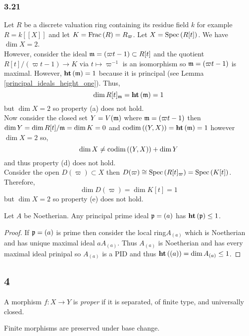 \documentclass[12pt]{article}
\begin{document}
\subsubsection{3.21}

Let $R$ be a discrete valuation ring containing its residue field $k$ for example $R = k[[X]]$ and let $K = \mathrm{Frac}\left(R\right) = R_\varpi$. Let $X = \mathrm{Spec}\left( R[t] \right)$. We have $\dim{X} = 2$. 
\bigskip\\
However, consider the ideal $\mathfrak{m} = (\varpi t - 1) \subset R[t]$ and the quotient $R[t]/(\varpi t - 1) \to K$ via $t \mapsto \varpi^{-1}$ is an isomorphism so $\mathfrak{m} = (\varpi t - 1)$ is maximal. However, $\mathbf{ht}\left( \mathfrak{m} \right) = 1$ because it is principal (see Lemma \ref{principal_ideals_height_one}). Thus,
\[ \dim{R[t]_{\mathfrak{m}}} = \mathbf{ht}\left( \mathfrak{m} \right) = 1 \]
but $\dim{X} = 2$ so property (a) does not hold.
\bigskip\\
Now consider the closed set $Y = V(\mathfrak{m})$ where $\mathfrak{m} = (\varpi t - 1)$ then $\dim{Y} = \dim{R[t] / \mathfrak{m}} = \dim{K} = 0$ and $\mathrm{codim}\left( (Y, X) \right) = \mathbf{ht}\left( \mathfrak{m} \right) = 1$ however $\dim{X} = 2$ so,
\[ \dim{X} \neq \mathrm{codim}\left( (Y, X) \right) + \dim{Y} \]
and thus property (d) does not hold. 
\bigskip\\
Consider the open $D(\varpi) \subset X$ then $D(\varpi) \cong \mathrm{Spec}\left( R[t]_\varpi \right) = \mathrm{Spec}\left( K[t] \right)$. Therefore,
\[ \dim{D(\varpi)} = \dim{K[t]} = 1 \]
but $\dim{X} = 2$ so property (e) does not hold.

\begin{lemma} \label{principal_ideals_height_one}
Let $A$ be Noetherian. Any principal prime ideal $\mathfrak{p} = (a)$ has $\mathbf{ht}\left( \mathfrak{p} \right) \le 1$.
\end{lemma}

\begin{proof}
If $\mathfrak{p} = (a)$ is prime then consider the local ring$A_{(a)}$ which is Noetherian and has unique maximal ideal $a A_{(a)}$. Thus $A_{(a)}$ is Noetherian and has every maximal ideal prinipal so $A_{(a)}$ is a PID and thus $\mathbf{ht}\left( (a) \right) = \dim{A_{(a)}} \le 1$.  
\end{proof}

\subsection{4}

\begin{definition}
A morphism $f : X \to Y$ is \textit{proper} if it is separated, of finite type, and universally closed. 
\end{definition}

\begin{lemma}
Finite morphisms are preserved under base change. 
\end{lemma}
\end{document}
